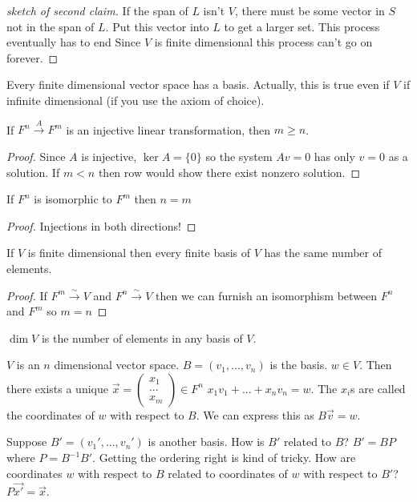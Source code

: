 \documentclass{article}
\newcommand{\ra}[1][]{\xrightarrow{#1}}
\begin{document}
\begin{proof}[sketch of second claim]
If the span of $L$ isn't $V$, there must be some vector in $S$ not in the span of $L$. Put this vector into $L$ to get a larger set. This process eventually has to end Since $V$ is finite dimensional  this process can't go on forever.
\end{proof}
\begin{corollary}
Every finite dimensional vector space has a basis. Actually, this is true even if $V$ if infinite dimensional (if you use the axiom of choice). 
\end{corollary}
\begin{proposition}
If $F^n\ra[A] F^m$ is an injective linear transformation, then $m\geq n$. 
\end{proposition}
\begin{proof}
Since $A$ is injective, $\ker A=\{0\}$ so the system $Av=0$ has only $v=0$ as a solution. If $m<n$ then row would show there exist nonzero solution. 
\end{proof}
\begin{corollary}
If $F^n$ is isomorphic to $F^m$ then $n=m$
\end{corollary}
\begin{proof}
Injections in both directions!
\end{proof}
\begin{corollary}
If $V$ is finite dimensional then every finite basis of $V$ has the same number of elements. 
\end{corollary}
\begin{proof}
If $F^m\ra[\sim]V$ and $F^n\ra[\sim]V$ then we can furnish an isomorphism between $F^n$ and $F^m$ so $m=n$
\end{proof}
\begin{definition}
$\dim V$ is the number of elements in any basis of $V$. 
\end{definition}
\begin{definition}[Coordinates]
$V$ is an $n$ dimensional vector space. $B=(v_1,...,v_n)$ is the basis. $w\in V$. Then there exists a unique $\vec{x}=\begin{pmatrix}x_1\\...\\x_m\end{pmatrix}\in F^n$ $x_1v_1+...+x_nv_n=w$. The $x_i$s are called the coordinates of $w$ with respect to $B$. We can express this as $B\vec{v}=w$. 
\end{definition}
\begin{definition}
Suppose $B'=(v_1',...,v_n')$ is another basis. How is $B'$ related to $B$? $B'=BP$ where $P=B^{-1}B'$. Getting the ordering right is kind of tricky. How are coordinates $w$ with respect to $B$ related to coordinates of $w$ with respect to $B'$? $P\vec{x'}=\vec{x}$. 
\end{definition}
\end{document}
